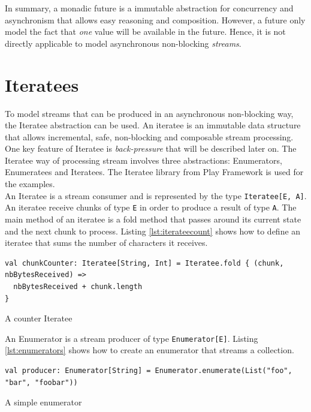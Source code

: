 In summary, a monadic future is a immutable abstraction for concurrency and asynchronism that allows easy reasoning and composition.
However, a future only model the fact that \textit{one} value will be available in the future. Hence, it is not directly applicable
to model asynchronous non-blocking \textit{streams}.


\section{Iteratees}

To model streams that can be produced in an asynchronous non-blocking way, the Iteratee abstraction can be used. An iteratee is an immutable data structure
that allows incremental, safe, non-blocking and composable stream processing. One key feature of Iteratee is \textit{back-pressure} that will be described later on.
The Iteratee way of processing stream involves three abstractions: Enumerators, Enumeratees and Iteratees. The Iteratee library from Play Framework 
 is used for the examples.
\\

An Iteratee is a stream consumer and is represented by the type \verb|Iteratee[E, A]|. An iteratee receive chunks of type \verb|E| 
in order to produce a result of type \verb|A|. The main method of an iteratee is a fold method that passes around its current state and the
next chunk to process.
Listing \ref{lst:iterateecount} shows how to define an iteratee that sums the number of characters it receives.

\begin{listing}[h]
\begin{verbatim}
val chunkCounter: Iteratee[String, Int] = Iteratee.fold { (chunk, nbBytesReceived) =>
  nbBytesReceived + chunk.length
}
\end{verbatim}
\caption{A counter Iteratee}
\label{lst:iterateecount}
\end{listing}

An Enumerator is a stream producer of type \verb|Enumerator[E]|. Listing \ref{lst:enumerators} shows how to create an enumerator that streams a collection.

\begin{listing}[h]
\begin{verbatim}
val producer: Enumerator[String] = Enumerator.enumerate(List("foo", "bar", "foobar"))
\end{verbatim}
\caption{A simple enumerator}
\label{lst:enumerators}
\end{listing}

